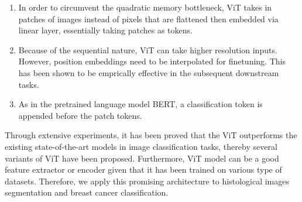 \documentclass[review]{cvpr}
\begin{document}
\begin{enumerate}
    \item In order to circumvent the quadratic memory bottleneck, ViT takes in patches of images instead of pixels that are flattened then embedded via linear layer, essentially taking patches as tokens.
    \item Because of the sequential nature, ViT can take higher resolution inputs. However, position embeddings need to be interpolated for finetuning. This has been shown to be emprically effective in the subsequent downstream tasks. 
    \item As in the pretrained language model BERT, a classification token is appended before the patch tokens.
\end{enumerate}
Through extensive experiments, it has been proved that the ViT outperforms the existing state-of-the-art models in image classification tasks, thereby several variants of ViT have been proposed\cite{wu2021cvt,zhou2021deepvit}. Furthermore, ViT model can be a good feature extractor or encoder given that it has been trained on various type of datasets. Therefore, we apply this promising architecture to histological images segmentation and breast cancer classification.

\end{document}
